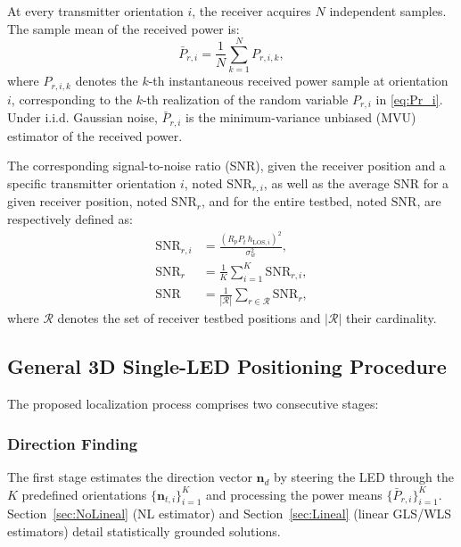 \documentclass[journal]{IEEEtran}
\begin{document}
At every transmitter orientation \(i\), the receiver acquires \(N\) independent samples. The sample mean of the received power is:
\begin{equation}
\bar P_{r,i}=\frac{1}{N}\sum_{k=1}^{N} P_{r,i,k},
\label{eq:sampleMean}
\end{equation}
where \(P_{r,i,k}\) denotes the \(k\)-th instantaneous received power sample at orientation \(i\), corresponding to the \(k\)-th realization of the random variable \(P_{r,i}\) in \eqref{eq:Pr_i}. Under i.i.d. Gaussian noise, \(\bar P_{r,i}\) is the minimum-variance unbiased (MVU) estimator of the received power.

The corresponding signal-to-noise ratio (SNR), given the receiver position and a specific transmitter orientation \(i\), noted $\mathrm{SNR}_{r,i}$, as well as the average SNR for a given receiver position, noted $\mathrm{SNR}_{r}$, and for the entire testbed, noted $\mathrm{SNR}$, are respectively defined as:
\begin{subequations}\label{eq:SNR}
\begin{align}
\mathrm{SNR}_{r,i} &= \frac{(R_pP_{t}\,h_{\text{LOS},i})^2}{\sigma_{w}^{2}}, \label{eq:SNRa} \\
\mathrm{SNR}_{r} &= \frac{1}{K}\sum_{i=1}^{K}\mathrm{SNR}_{r,i}, \label{eq:SNRb} \\
\mathrm{SNR} &= \frac{1}{|\mathcal{R}|}\sum_{r\in\mathcal{R}}{\mathrm{SNR}}_{r}, \label{eq:SNRc}
\end{align}
\end{subequations}
where \(\mathcal{R}\) denotes the set of receiver testbed positions and $|\mathcal R|$ their cardinality. 


\subsection{General 3D Single-LED Positioning Procedure}

The proposed localization process comprises two consecutive stages:

\subsubsection{Direction Finding}

The first stage estimates the direction vector \(\mathbf{n}_{d}\) by steering the LED through the
\(K\) predefined orientations \(\{\mathbf{n}_{t,i}\}_{i=1}^{K}\) and processing
the power means \(\{\bar P_{r,i}\}_{i=1}^{K}\).  
Section~\ref{sec:NoLineal} (NL estimator) and Section~\ref{sec:Lineal} (linear GLS/WLS estimators) detail statistically grounded solutions.
\end{document}
